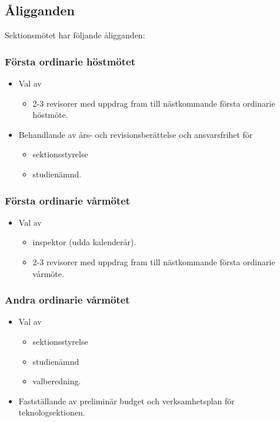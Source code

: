 \subsection{Åligganden}
Sektionsmötet har följande åligganden:
\subsubsection{Första ordinarie höstmötet}
\begin{itemize}
	\item Val av 
	\begin{itemize}
        \item 2-3 revisorer med uppdrag fram till nästkommande första ordinarie höstmöte.
	\end{itemize}
	\item Behandlande av års- och revisionsberättelse och ansvarsfrihet för 
	\begin{itemize}
		\item sektionsstyrelse
		\item studienämnd.
	\end{itemize}
\end{itemize}
	
\subsubsection{Första ordinarie vårmötet}
\begin{itemize}
	\item Val av 
	\begin{itemize}
		\item inspektor (udda kalenderår).
	    \item 2-3 revisorer med uppdrag fram till nästkommande första ordinarie vårmöte.
	\end{itemize}
\end{itemize}


\subsubsection{Andra ordinarie vårmötet}
\begin{itemize}
	\item Val av 
	\begin{itemize}
		\item sektionsstyrelse
		\item studienämnd 		
		\item valberedning.
	\end{itemize}
	\item Fastställande av preliminär budget och verksamhetsplan för teknologsektionen.
\end{itemize}

